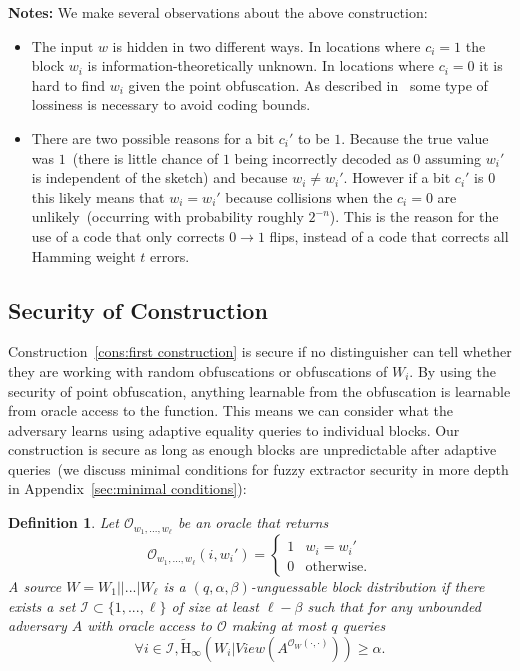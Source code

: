 \documentclass[11pt]{article}
\newcommand{\apref}[1]{\mbox{Appendix~\ref{#1}}}
\newcommand{\consref}[1]{\mbox{Construction~\ref{#1}}}
\newcommand{\Hav}{\tilde{\mathrm{H}}_\infty}
\newtheorem{definition}[theorem]{Definition}
\begin{document}
\textbf{Notes:}  We make several observations about the above construction:
\begin{itemize}
\item The input $w$ is hidden in two different ways.  In locations where $c_i=1$ the block $w_i$ is information-theoretically unknown.
In locations where $c_i=0$ it is hard to find $w_i$ given the point obfuscation.  As described in~\cite[Section 3.3]{fuller2013computational} some type of lossiness is necessary to avoid coding bounds.
\item There are two possible reasons for a bit $c_i'$ to be $1$.  Because the true value was $1$~(there is little chance of $1$ being incorrectly decoded as $0$ assuming $w_i'$ is independent of the sketch) and because $w_i \neq w_i'$.  However if a bit $c_i'$ is $0$ this likely means that $w_i=w_i'$ because collisions when the $c_i=0$ are unlikely~(occurring with probability roughly $2^{-n}$).  This is the reason for the use of a code that only corrects $0\rightarrow 1$ flips, instead of a code that corrects all Hamming weight $t$ errors.
\end{itemize}

\subsection{Security of Construction}
\label{sec:sec of construction}
\consref{cons:first construction} is secure if no distinguisher can tell whether they are working with random obfuscations or obfuscations of $W_i$.  By using the security of point obfuscation, anything learnable from the obfuscation is learnable from oracle access to the function.  This means we can consider what the adversary learns using adaptive equality queries to individual blocks.  Our construction is secure as long as enough blocks are unpredictable after adaptive queries~(we discuss minimal conditions for fuzzy extractor security in more depth in \apref{sec:minimal conditions}):

\begin{definition}
\label{def:block guessable}
Let $\mathcal{O}_{w_1,..., w_\ell}$ be an oracle that returns \[\mathcal{O}_{w_1,..., w_\ell}(i, w_i')=
\begin{cases}
1 & w_i = w_i'\\
0 & \text{otherwise}.
\end{cases}
\]
A source $W = W_1||...|W_\ell$ is a $(q, \alpha, \beta)$-\emph{unguessable block distribution} if there exists a set $\mathcal{I}\subset\{1,..., \ell\}$ of size at least $\ell -\beta$ such that for any unbounded adversary $A$ with oracle access to $\mathcal{O}$ making at most $q$ queries  
\[
\forall i\in \mathcal{I}, \Hav(W_i |View(A^{\mathcal{O}_{W}(\cdot, \cdot)}))\geq \alpha.
\]
\end{definition}
\end{document}
